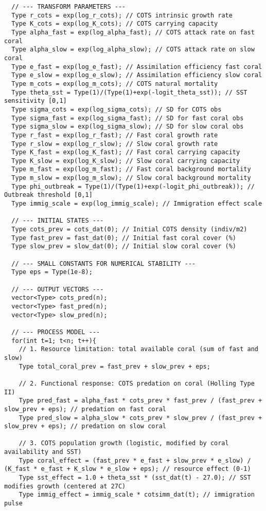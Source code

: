 \begin{lstlisting}
  // --- TRANSFORM PARAMETERS ---
  Type r_cots = exp(log_r_cots); // COTS intrinsic growth rate
  Type K_cots = exp(log_K_cots); // COTS carrying capacity
  Type alpha_fast = exp(log_alpha_fast); // COTS attack rate on fast coral
  Type alpha_slow = exp(log_alpha_slow); // COTS attack rate on slow coral
  Type e_fast = exp(log_e_fast); // Assimilation efficiency fast coral
  Type e_slow = exp(log_e_slow); // Assimilation efficiency slow coral
  Type m_cots = exp(log_m_cots); // COTS natural mortality
  Type theta_sst = Type(1)/(Type(1)+exp(-logit_theta_sst)); // SST sensitivity [0,1]
  Type sigma_cots = exp(log_sigma_cots); // SD for COTS obs
  Type sigma_fast = exp(log_sigma_fast); // SD for fast coral obs
  Type sigma_slow = exp(log_sigma_slow); // SD for slow coral obs
  Type r_fast = exp(log_r_fast); // Fast coral growth rate
  Type r_slow = exp(log_r_slow); // Slow coral growth rate
  Type K_fast = exp(log_K_fast); // Fast coral carrying capacity
  Type K_slow = exp(log_K_slow); // Slow coral carrying capacity
  Type m_fast = exp(log_m_fast); // Fast coral background mortality
  Type m_slow = exp(log_m_slow); // Slow coral background mortality
  Type phi_outbreak = Type(1)/(Type(1)+exp(-logit_phi_outbreak)); // Outbreak threshold [0,1]
  Type immig_scale = exp(log_immig_scale); // Immigration effect scale

  // --- INITIAL STATES ---
  Type cots_prev = cots_dat(0); // Initial COTS density (indiv/m2)
  Type fast_prev = fast_dat(0); // Initial fast coral cover (%)
  Type slow_prev = slow_dat(0); // Initial slow coral cover (%)

  // --- SMALL CONSTANTS FOR NUMERICAL STABILITY ---
  Type eps = Type(1e-8);

  // --- OUTPUT VECTORS ---
  vector<Type> cots_pred(n);
  vector<Type> fast_pred(n);
  vector<Type> slow_pred(n);

  // --- PROCESS MODEL ---
  for(int t=1; t<n; t++){
    // 1. Resource limitation: total available coral (sum of fast and slow)
    Type total_coral_prev = fast_prev + slow_prev + eps;

    // 2. Functional response: COTS predation on coral (Holling Type II)
    Type pred_fast = alpha_fast * cots_prev * fast_prev / (fast_prev + slow_prev + eps); // predation on fast coral
    Type pred_slow = alpha_slow * cots_prev * slow_prev / (fast_prev + slow_prev + eps); // predation on slow coral

    // 3. COTS population growth (logistic, modified by coral availability and SST)
    Type coral_effect = (fast_prev * e_fast + slow_prev * e_slow) / (K_fast * e_fast + K_slow * e_slow + eps); // resource effect (0-1)
    Type sst_effect = 1.0 + theta_sst * (sst_dat(t) - 27.0); // SST modifies growth (centered at 27C)
    Type immig_effect = immig_scale * cotsimm_dat(t); // immigration pulse


\end{lstlisting}
